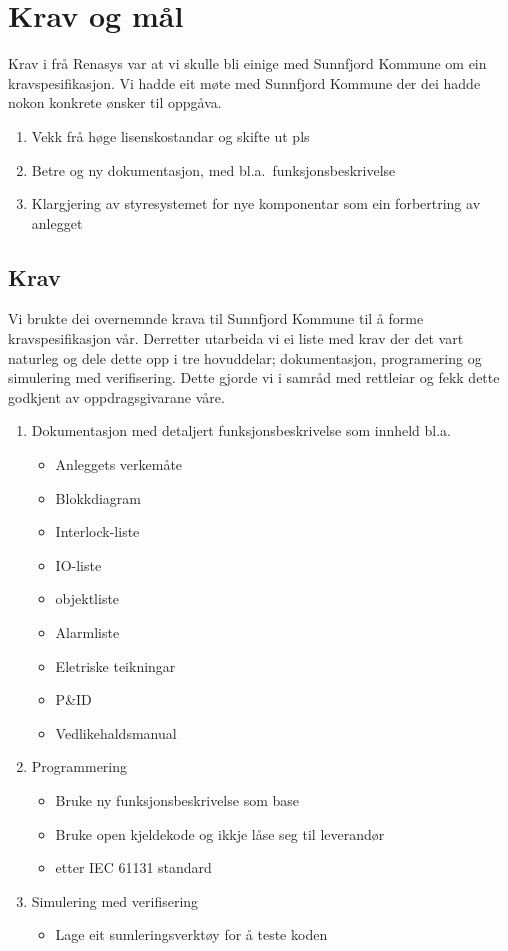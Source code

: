\chapter{Krav og mål}
\thispagestyle{fancy}
Krav i frå \gls{Renasys} var at vi skulle bli einige med \gls{Sunnfjord Kommune} om ein kravspesifikasjon.
Vi hadde eit møte med \gls{Sunnfjord Kommune} der dei hadde nokon konkrete ønsker til oppgåva.

\begin{enumerate}
    \item Vekk frå høge lisenskostandar og skifte ut pls
    \item Betre og ny dokumentasjon, med bl.a.\ funksjonsbeskrivelse
    \item Klargjering av styresystemet for nye komponentar som ein forbertring av anlegget
\end{enumerate}

\section{Krav}
Vi brukte dei overnemnde krava til \gls{Sunnfjord Kommune} til å forme kravspesifikasjon vår.
Derretter utarbeida vi ei liste med krav der det vart naturleg og dele dette opp i tre
hovuddelar; dokumentasjon, programering og simulering med verifisering. Dette gjorde vi i samråd med rettleiar
og fekk dette godkjent av oppdragsgivarane våre.

\begin{enumerate}
    \item Dokumentasjon med detaljert funksjonsbeskrivelse som innheld bl.a.
        \begin{itemize} 
        \item Anleggets verkemåte
        \item Blokkdiagram
        \item Interlock-liste
        \item IO-liste
        \item objektliste
        \item Alarmliste
        \item Eletriske teikningar
        \item P\&ID
        \item Vedlikehaldsmanual
        \end{itemize}
    \item Programmering
        \begin{itemize}
        \item Bruke ny funksjonsbeskrivelse som base
        \item Bruke open kjeldekode og ikkje låse seg til leverandør
        \item etter IEC 61131 standard
        \end{itemize}
    \item Simulering med verifisering
        \begin{itemize}
        \item Lage eit sumleringsverktøy for å teste koden
        \end{itemize}
\end{enumerate}

